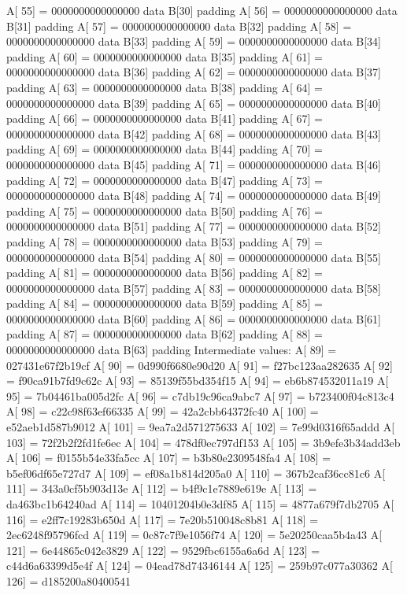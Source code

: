 A[  55] = 0000000000000000 data B[30] padding
A[  56] = 0000000000000000 data B[31] padding
A[  57] = 0000000000000000 data B[32] padding
A[  58] = 0000000000000000 data B[33] padding
A[  59] = 0000000000000000 data B[34] padding
A[  60] = 0000000000000000 data B[35] padding
A[  61] = 0000000000000000 data B[36] padding
A[  62] = 0000000000000000 data B[37] padding
A[  63] = 0000000000000000 data B[38] padding
A[  64] = 0000000000000000 data B[39] padding
A[  65] = 0000000000000000 data B[40] padding
A[  66] = 0000000000000000 data B[41] padding
A[  67] = 0000000000000000 data B[42] padding
A[  68] = 0000000000000000 data B[43] padding
A[  69] = 0000000000000000 data B[44] padding
A[  70] = 0000000000000000 data B[45] padding
A[  71] = 0000000000000000 data B[46] padding
A[  72] = 0000000000000000 data B[47] padding
A[  73] = 0000000000000000 data B[48] padding
A[  74] = 0000000000000000 data B[49] padding
A[  75] = 0000000000000000 data B[50] padding
A[  76] = 0000000000000000 data B[51] padding
A[  77] = 0000000000000000 data B[52] padding
A[  78] = 0000000000000000 data B[53] padding
A[  79] = 0000000000000000 data B[54] padding
A[  80] = 0000000000000000 data B[55] padding
A[  81] = 0000000000000000 data B[56] padding
A[  82] = 0000000000000000 data B[57] padding
A[  83] = 0000000000000000 data B[58] padding
A[  84] = 0000000000000000 data B[59] padding
A[  85] = 0000000000000000 data B[60] padding
A[  86] = 0000000000000000 data B[61] padding
A[  87] = 0000000000000000 data B[62] padding
A[  88] = 0000000000000000 data B[63] padding
Intermediate values:
A[  89] = 027431e67f2b19cf
A[  90] = 0d990f6680e90d20
A[  91] = f27bc123aa282635
A[  92] = f90ca91b7fd9c62c
A[  93] = 85139f55bd354f15
A[  94] = eb6b874532011a19
A[  95] = 7b04461ba005d2fc
A[  96] = c7db19c96ca9abc7
A[  97] = b723400f04c813c4
A[  98] = c22c98f63ef66335
A[  99] = 42a2cbb64372fc40
A[ 100] = e52aeb1d587b9012
A[ 101] = 9ea7a2d571275633
A[ 102] = 7e99d0316f65addd
A[ 103] = 72f2b2f2fd1fe6ec
A[ 104] = 478df0ec797df153
A[ 105] = 3b9efe3b34add3eb
A[ 106] = f0155b54e33fa5cc
A[ 107] = b3b80e2309548fa4
A[ 108] = b5ef06df65e727d7
A[ 109] = ef08a1b814d205a0
A[ 110] = 367b2caf36cc81c6
A[ 111] = 343a0cf5b903d13e
A[ 112] = b4f9c1e7889e619e
A[ 113] = da463bc1b64240ad
A[ 114] = 10401204b0e3df85
A[ 115] = 4877a679f7db2705
A[ 116] = e2ff7c19283b650d
A[ 117] = 7e20b510048c8b81
A[ 118] = 2ec6248f95796fcd
A[ 119] = 0c87c7f9e1056f74
A[ 120] = 5e20250caa5b4a43
A[ 121] = 6e44865c042e3829
A[ 122] = 9529fbc6155a6a6d
A[ 123] = c44d6a63399d5e4f
A[ 124] = 04ead78d74346144
A[ 125] = 259b97c077a30362
A[ 126] = d185200a80400541
